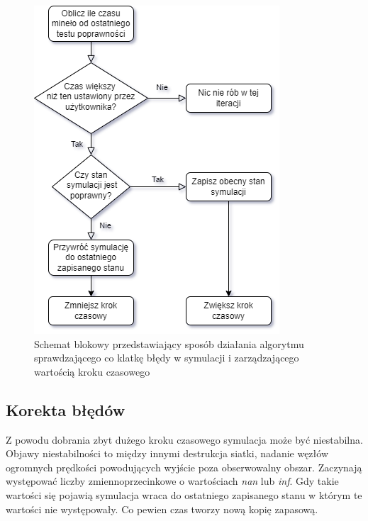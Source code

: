 \documentclass[12pt, letterpaper]{report}
\begin{document}
    \begin{figure}
        \includegraphics[width=0.95\linewidth]{error_correction.drawio.png}
        \caption{
            Schemat blokowy przedstawiający sposób działania
            algorytmu sprawdzającego co klatkę
            błędy w symulacji i zarządzającego wartością kroku czasowego
        }
    \end{figure}

    \subsection{Korekta błędów}
    Z powodu dobrania zbyt dużego kroku czasowego symulacja może być niestabilna.
    Objawy niestabilności to między innymi destrukcja siatki, nadanie węzłów 
    ogromnych prędkości powodujących wyjście poza obserwowalny obszar.
    Zaczynają występować liczby zmiennoprzecinkowe o wartościach \emph{nan} lub \emph{inf}.
    Gdy takie wartości się pojawią symulacja wraca do ostatniego zapisanego stanu w którym 
    te wartości nie występowały. Co pewien czas tworzy nową kopię zapasową. \\
\end{document}

